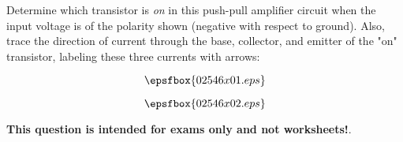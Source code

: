 

Determine which transistor is {\it on} in this push-pull amplifier circuit when the input voltage is of the polarity shown (negative with respect to ground).  Also, trace the direction of current through the base, collector, and emitter of the "on" transistor, labeling these three currents with arrows:

$$\epsfbox{02546x01.eps}$$







$$\epsfbox{02546x02.eps}$$







{\bf This question is intended for exams only and not worksheets!}.




